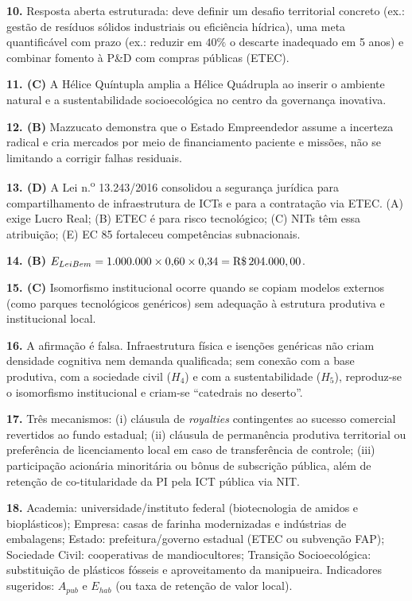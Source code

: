 \begin{boxGabarito}
\textbf{10.} Resposta aberta estruturada: deve definir um desafio territorial concreto (ex.: gestão de resíduos sólidos industriais ou eficiência hídrica), uma meta quantificável com prazo (ex.: reduzir em $40\%$ o descarte inadequado em 5 anos) e combinar fomento à P\&D com compras públicas (ETEC).

\textbf{11. (C)} A Hélice Quíntupla amplia a Hélice Quádrupla ao inserir o ambiente natural e a sustentabilidade socioecológica no centro da governança inovativa.

\textbf{12. (B)} Mazzucato demonstra que o Estado Empreendedor assume a incerteza radical e cria mercados por meio de financiamento paciente e missões, não se limitando a corrigir falhas residuais.

\textbf{13. (D)} A Lei n.\textsuperscript{o} 13.243/2016 consolidou a segurança jurídica para compartilhamento de infraestrutura de ICTs e para a contratação via ETEC. (A) exige Lucro Real; (B) ETEC é para risco tecnológico; (C) NITs têm essa atribuição; (E) EC 85 fortaleceu competências subnacionais.

\textbf{14. (B)} $E_{LeiBem} = 1.000.000 \times 0{,}60 \times 0{,}34 = \text{R\$\,}{204.000,00}$.

\textbf{15. (C)} Isomorfismo institucional ocorre quando se copiam modelos externos (como parques tecnológicos genéricos) sem adequação à estrutura produtiva e institucional local.

\textbf{16.} A afirmação é falsa. Infraestrutura física e isenções genéricas não criam densidade cognitiva nem demanda qualificada; sem conexão com a base produtiva, com a sociedade civil ($H_4$) e com a sustentabilidade ($H_5$), reproduz-se o isomorfismo institucional e criam-se ``catedrais no deserto''.

\textbf{17.} Três mecanismos: (i) cláusula de \textit{royalties} contingentes ao sucesso comercial revertidos ao fundo estadual; (ii) cláusula de permanência produtiva territorial ou preferência de licenciamento local em caso de transferência de controle; (iii) participação acionária minoritária ou bônus de subscrição pública, além de retenção de co-titularidade da PI pela ICT pública via NIT.

\textbf{18.} Academia: universidade/instituto federal (biotecnologia de amidos e bioplásticos); Empresa: casas de farinha modernizadas e indústrias de embalagens; Estado: prefeitura/governo estadual (ETEC ou subvenção FAP); Sociedade Civil: cooperativas de mandiocultores; Transição Socioecológica: substituição de plásticos fósseis e aproveitamento da manipueira. Indicadores sugeridos: $A_{pub}$ e $E_{hab}$ (ou taxa de retenção de valor local).
\end{boxGabarito}

